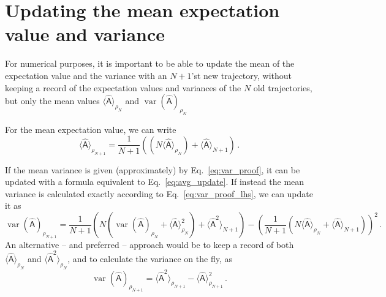 \documentclass[letter,aps,pra,onecolumn,noshowpacs,superscriptaddress,preprintnumbers, kamsmath,amssymb]{revtex4}
\newcommand{\var}{\operatorname{var}}
\newcommand{\Avg}[1]{\langle#1\rangle}
\newcommand{\Op}[1]{\ensuremath{\mathsf{\hat{#1}}}}
\begin{document}
\section{Updating the mean expectation value and variance}

For numerical purposes, it is important to be able to update the mean of the
expectation value and the variance with an $N+1$'st new trajectory, without
keeping a record of the expectation values and variances of the $N$ old
trajectories, but only the mean values $\Avg{\Op{A}}_{\rho_N}$
and $\var(\Op{A})_{\rho_N}$

For the mean expectation value, we can write
\begin{equation}
  \Avg{\Op{A}}_{\rho_{N+1}}
  = \frac{1}{N+1} \left(
      \left(N \Avg{\Op{A}}_{\rho_{N}}\right) + \Avg{\Op{A}}_{N+1}
    \right)\,.
  \label{eq:avg_update}
\end{equation}

If the mean variance is given (approximately) by Eq.~\eqref{eq:var_proof}, it
can be updated with a formula equivalent to Eq.~\eqref{eq:avg_update}. If
instead the mean variance is calculated exactly according to
Eq.~\eqref{eq:var_proof_lhs}, we can update it as
\begin{equation}
  \var(\Op{A})_{\rho_{N+1}}
  = \frac{1}{N+1} \left(
    N \left( \var(\Op{A})_{\rho_{N}} + \Avg{\Op{A}}_{\rho_N}^2 \right)
    + \Avg{\Op{A}^2}_{N+1}
  \right)
  - \left(\frac{1}{N+1} \left(
    N \Avg{\Op{A}}_{\rho_N}
    + \Avg{\Op{A}}_{N+1}
\right)\right)^2\,.
\end{equation}
An alternative -- and preferred -- approach would be to keep a record of both
$\Avg{\Op{A}}_{\rho_N}$ and $\Avg{\Op{A}^2}_{\rho_N}$, and to calculate the
variance on the fly, as
\begin{equation}
  \var(\Op{A})_{\rho_{N+1}}
  = \Avg{\Op{A}^2}_{\rho_{N+1}} - \Avg{\Op{A}}_{\rho_{N+1}}^2\,.
\end{equation}

%
\end{document}
